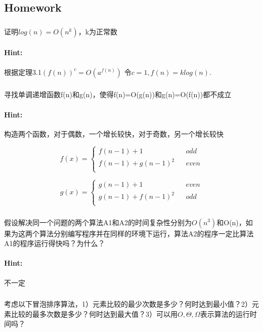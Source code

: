 \documentclass{article}
\begin{document}
      \subsection{Homework}
     
     \subsubsection{} 证明$log(n) = O(n^{k})$，k为正常数
     \paragraph{Hint:}根据定理3.1$(f(n))^{c}=O(a^{f(n)})$ 令$c = 1, f(n) = klog(n)$.
     
     \subsubsection{}寻找单调递增函数f(n)和g(n)，使得f(n)=O(g(n))和g(n)=O(f(n))都不成立
     \paragraph{Hint:}构造两个函数，对于偶数，一个增长较快，对于奇数，另一个增长较快

$$ f(x)=\left\{
\begin{aligned}
f(n-1) +1 &  &odd\\
f(n-1)+g(n-1)^{2}&  & even\\
\end{aligned}
\right.
$$

$$g(x)=\left\{
\begin{aligned}
g(n-1) +1 &  & even\\
g(n-1)+f(n-1)^{2}&  &odd\\
\end{aligned}
\right.
$$
     
     \subsubsection{}假设解决同一个问题的两个算法A1和A2的时间复杂性分别为$O(n^{3})$和O(n)，如果为这两个算法分别编写程序并在同样的环境下运行，算法A2的程序一定比算法A1的程序运行得快吗？为什么？
     \paragraph{Hint:}不一定
     
     \subsubsection{}考虑以下冒泡排序算法，1）元素比较的最少次数是多少？何时达到最小值？2）元素比较的最多次数是多少？何时达到最大值？3）可以用$O,\Theta,\Omega$表示算法的运行时间吗？
     
\end{document}
